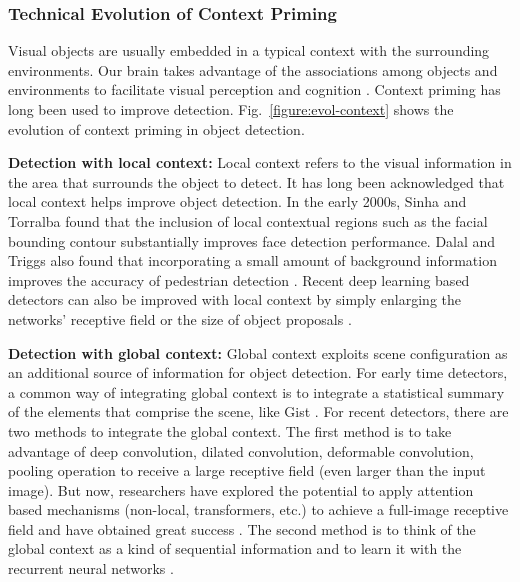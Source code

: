 \documentclass[lettersize,journal]{IEEEtran}
\begin{document}
\subsubsection{Technical Evolution of Context Priming}

Visual objects are usually embedded in a typical context with the surrounding environments. Our brain takes advantage of the associations among objects and environments to facilitate visual perception and cognition \cite{CVPR09-EmpContext}. Context priming has long been used to improve detection. Fig.\ \ref{figure:evol-context} shows the evolution of context priming in object detection.

\textbf{Detection with local context:} Local context refers to the visual information in the area that surrounds the object to detect. It has long been acknowledged that local context helps improve object detection. In the early 2000s, Sinha and Torralba \cite{MITAILAB01-Faces} found that the inclusion of local contextual regions such as the facial bounding contour substantially improves face detection performance. Dalal and Triggs also found that incorporating a small amount of background information improves the accuracy of pedestrian detection \cite{CVPR05-HOG}. Recent deep learning based detectors can also be improved with local context by simply enlarging the networks' receptive field or the size of object proposals \cite{BMVC16-MultiPath, ECCV16-GBDNet, TPAMI18-GBDNet, ACCV16-RCNNforSmall, arXiv17-CCNet, CVPR15-MultiRegion, ICCV17-CoupleNet}.

\textbf{Detection with global context:} Global context exploits scene configuration as an additional source of information for object detection. For early time detectors, a common way of integrating global context is to integrate a statistical summary of the elements that comprise the scene, like Gist \cite{CVPR09-EmpContext}. For recent detectors, there are two methods to integrate the global context. The first method is to take advantage of deep convolution, dilated convolution, deformable convolution, pooling operation \cite{li2019scale, liu2018receptive, AAAI18-RFCN++} to receive a large receptive field (even larger than the input image). But now, researchers have explored the potential to apply attention based mechanisms (non-local, transformers, etc.) to achieve a full-image receptive field and have obtained great success \cite{wang2018non, carion2020end}. The second method is to think of the global context as a kind of sequential information and to learn it with the recurrent neural networks \cite{CVPR16-ION, TMM17-AttenContext}.
\end{document}
